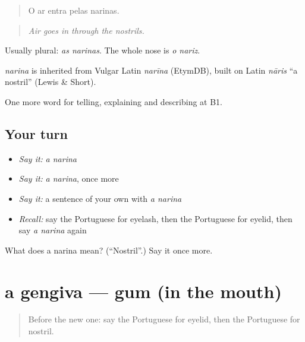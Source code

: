 \begin{quote}
O ar entra pelas narinas.
\end{quote}

\begin{quote}
\emph{Air goes in through the nostrils.}
\end{quote}

Usually plural: \emph{as narinas}. The whole nose is \emph{o nariz}.

\begin{cousinweb}
\emph{narina} is inherited from Vulgar Latin \emph{narīna} (EtymDB), built on Latin \emph{nāris} \textquotedblleft{}a nostril\textquotedblright{} (Lewis \& Short).
\end{cousinweb}

\begin{grammarlens}[title={What you've built}]
One more word for telling, explaining and describing at B1.
\end{grammarlens}

\subsection*{Your turn}
\begin{itemize}
\raggedright
  \item \emph{Say it:} \emph{a narina}
  \item \emph{Say it:} \emph{a narina}, once more
  \item \emph{Say it:} a sentence of your own with \emph{a narina}
  \item \emph{Recall:} say the Portuguese for eyelash, then the Portuguese for eyelid, then say \emph{a narina} again
\end{itemize}

\begin{tcolorbox}[breakable,colback=teal!4,colframe=teal!35!black,title={Before you move on}]
What does a narina mean? (\textquotedblleft{}Nostril\textquotedblright{}.) Say it once more.
\end{tcolorbox}
\section[a gengiva]{a gengiva — gum (in the mouth)}

\label{lesson:PT-C481-gengiva}



\begin{quote}
Before the new one: say the Portuguese for eyelid, then the Portuguese for nostril.
\end{quote}

